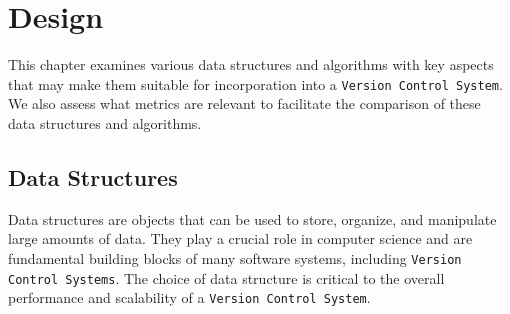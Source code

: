 \lstset{language=bash}
\newpage
\chapter{Design} %
\label{chap:design}
This chapter examines various data structures and algorithms with key aspects that may make them suitable for incorporation into a \lstinline{Version Control System}. We also assess what metrics are relevant to facilitate the comparison of these data structures and algorithms.

% 
% 
% 
\section{Data Structures}
Data structures are objects that can be used to store, organize, and manipulate large amounts of data. They play a crucial role in computer science and are fundamental building blocks of many software systems, including \lstinline{Version Control Systems}. The choice of data structure is critical to the overall performance and scalability of a \lstinline{Version Control System}.
\smallskip

